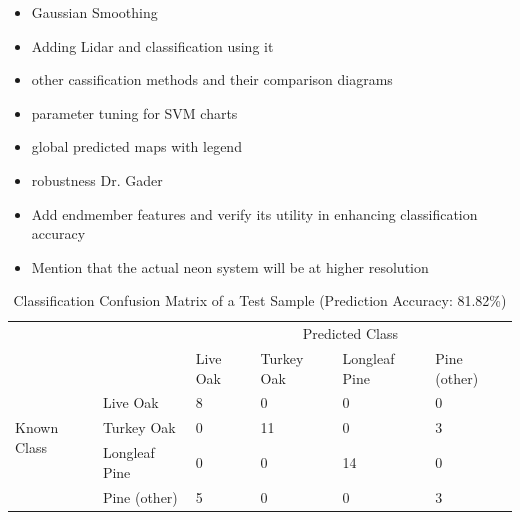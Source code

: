 \documentclass[remotesensing,article,accept,moreauthors,pdftex,12pt,a4paper]{mdpi}
\begin{document}
\begin{itemize}
\item Gaussian Smoothing
\item Adding Lidar and classification using it
\item other cassification methods and their comparison diagrams
\item parameter tuning for SVM charts
\item global predicted maps with legend
\item robustness Dr. Gader

\item Add endmember features and verify its utility in enhancing classification accuracy
\item Mention that the actual neon system will be at higher resolution
\end{itemize}



\begin{table}[t]
\begin{center}

\begin{tabular}{llllll}
                                       &                       & \multicolumn{4}{c}{Predicted Class}                                                                          \\ \cline{3-6} 
                                       & \multicolumn{1}{l|}{} & \multicolumn{1}{l|}{Live Oak} & \multicolumn{1}{l|}{Turkey Oak} & \multicolumn{1}{l|}{Longleaf Pine} & \multicolumn{1}{l|}{Pine (other)} \\ \cline{2-6} 
\multicolumn{1}{l|}{\multirow{3}{*}{\begin{sideways}Known Class\end{sideways}}} & \multicolumn{1}{l|}{Live Oak}      & \multicolumn{1}{l|}{8} & \multicolumn{1}{l|}{0} & \multicolumn{1}{l|}{0} & \multicolumn{1}{l|}{0} \\ \cline{2-6} 
\multicolumn{1}{l|}{}                                                           & \multicolumn{1}{l|}{Turkey Oak}    & \multicolumn{1}{l|}{0} & \multicolumn{1}{l|}{11} & \multicolumn{1}{l|}{0} & \multicolumn{1}{l|}{3} \\ \cline{2-6} 
\multicolumn{1}{l|}{}                                                           & \multicolumn{1}{l|}{Longleaf Pine} & \multicolumn{1}{l|}{0} & \multicolumn{1}{l|}{0} & \multicolumn{1}{l|}{14} & \multicolumn{1}{l|}{0} \\ \cline{2-6} 
\multicolumn{1}{l|}{}                                                           & \multicolumn{1}{l|}{Pine (other)}  & \multicolumn{1}{l|}{5} & \multicolumn{1}{l|}{0} & \multicolumn{1}{l|}{0} & \multicolumn{1}{l|}{3} \\ \cline{2-6} 
\end{tabular}
 \caption{Classification Confusion Matrix of a Test Sample (Prediction Accuracy: 81.82\%)}
    \label{table:confusion matrix}\end{center}
\end{table}
\end{document}
